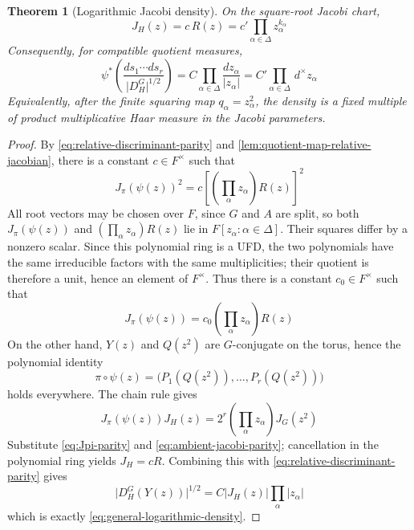 \documentclass[11pt]{amsart}
\newtheorem{theorem}{Theorem}[section]
\theoremstyle{definition}
\theoremstyle{remark}
\newcommand{\dmeas}{\,d^{\times}}
\newcommand{\abs}[1]{\lvert #1\rvert}
\begin{document}
\begin{theorem}[Logarithmic Jacobi density]\label{thm:jacobi-log-density}
On the square-root Jacobi chart,
\begin{equation}\label{eq:H-jacobian-parity}
 J_H(z)=c\,R(z)
 =c'\prod_{\alpha\in\Delta}z_\alpha^{k_\alpha}
\end{equation}
Consequently, for compatible quotient measures,
\begin{equation}\label{eq:general-logarithmic-density}
 \psi^*\left(
 \frac{ds_1\cdots ds_r}{\abs{D_H^G}^{1/2}}
 \right)
 =C\prod_{\alpha\in\Delta}\frac{dz_\alpha}{\abs{z_\alpha}}
 =C'\prod_{\alpha\in\Delta}\dmeas z_\alpha
\end{equation}
Equivalently, after the finite squaring map $q_\alpha=z_\alpha^2$, the density
is a fixed multiple of product multiplicative Haar measure in the Jacobi
parameters.
\end{theorem}

\begin{proof}
By \eqref{eq:relative-discriminant-parity} and
\cref{lem:quotient-map-relative-jacobian}, there is a constant
$c\in F^\times$ such that
\[
  J_\pi(\psi(z))^2
  =
  c\left[
    \left(\prod_\alpha z_\alpha\right)R(z)
  \right]^2
\]
All root vectors may be chosen over $F$, since $G$ and $A$ are split, so both
$J_\pi(\psi(z))$ and $(\prod_\alpha z_\alpha)R(z)$ lie in
$F[z_\alpha:\alpha\in\Delta]$.  Their squares differ by a nonzero scalar.
Since this polynomial ring is a UFD, the two polynomials have the same
irreducible factors with the same multiplicities; their quotient is therefore
a unit, hence an element of $F^\times$.  Thus there is a constant
$c_0\in F^\times$ such that
\begin{equation}\label{eq:Jpi-parity}
  J_\pi(\psi(z))
  =
  c_0\left(\prod_\alpha z_\alpha\right)R(z)
\end{equation}
On the other hand, $Y(z)$ and $Q(z^2)$ are $G$-conjugate on the torus, hence
the polynomial identity
\[
 \pi\circ\psi(z)
 =\bigl(P_1(Q(z^2)),\ldots,P_r(Q(z^2))\bigr)
\]
holds everywhere.  The chain rule gives
\begin{equation}\label{eq:jacobi-chain-rule}
 J_\pi(\psi(z))J_H(z)
 =2^r\left(\prod_\alpha z_\alpha\right)J_G(z^2)
\end{equation}
Substitute \eqref{eq:Jpi-parity} and
\eqref{eq:ambient-jacobi-parity}; cancellation in the polynomial ring yields
$J_H=cR$.  Combining this with
\eqref{eq:relative-discriminant-parity} gives
\[
 \abs{D_H^G(Y(z))}^{1/2}
 =C\abs{J_H(z)}\prod_\alpha\abs{z_\alpha}
\]
which is exactly \eqref{eq:general-logarithmic-density}.
\end{proof}
\end{document}

